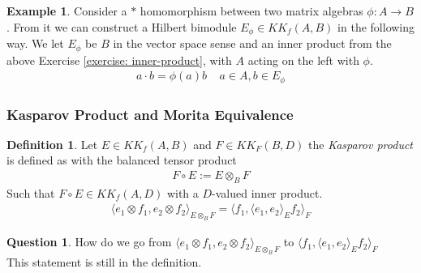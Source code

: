 \documentclass[a4paper]{article}
\newcounter{exercise}
\theoremstyle{definition}
\newtheorem{definition}{Definition}
\theoremstyle{definition}
\newtheorem{question}{Question}
\theoremstyle{definition}
\newtheorem{example}{Example}
\theoremstyle{theorem}
\theoremstyle{theorem}
\begin{document}
\begin{example}
    Consider a $*$ homomorphism between two matrix algebras $\phi:A\rightarrow B$.
    From it we can construct a Hilbert bimodule $E_{\phi} \in KK_f(A, B)$ in the following way.
    We let $E_{\phi}$ be $B$ in the vector space sense and an inner product from the above
    Exercise \ref{exercise: inner-product}, with $A$ acting on the left with $\phi$.
    \begin{align}
        a\cdot b = \phi(a)b \;\;\;\; a\in A, b\in E_{\phi}
    \end{align}
\end{example}



\subsubsection{Kasparov Product and Morita Equivalence}
\begin{definition}
    Let $E \in KK_f(A, B)$ and $F \in KK_F(B, D)$ the \textit{Kasparov product} is defined as
    with the balanced tensor product
    \begin{align}
        F \circ E := E \otimes _B F
    \end{align}
    Such that $F\circ E \in KK_f(A,D)$ with a $D$-valued inner product.
    \begin{align}
        \langle e_1 \otimes f_1, e_2 \otimes f_2\rangle _{E\otimes _B F} = \langle f_1,\langle e_1, e_2\rangle _E f_2\rangle _F
    \end{align}
\end{definition}

\begin{question}
 How do we go from $\langle e_1 \otimes f_1, e_2 \otimes f_2\rangle _{E\otimes _B F}$ to $
    \langle f_1,\langle e_1, e_2\rangle _E f_2\rangle _F$ \label{q: tensorproduct}\\
    This statement is still in the definition.
\end{question}

\end{document}
